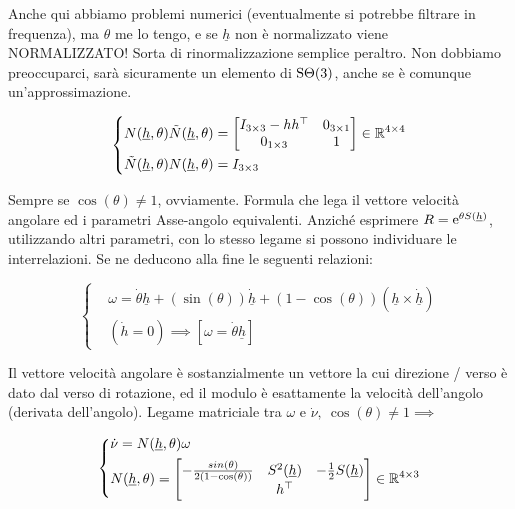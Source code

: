 Anche qui abbiamo problemi numerici (eventualmente si potrebbe filtrare in frequenza), ma $\theta$ me lo tengo, e se $\underline{h}$ non è normalizzato viene NORMALIZZATO! Sorta di rinormalizzazione semplice peraltro. Non dobbiamo preoccuparci, sarà sicuramente un elemento di $\operatorname{S\Theta}(3)$, anche se è comunque un'approssimazione.

\[
	\left\{
	\begin{aligned}
	&N(\underline{h},\theta)\tilde{N}(\underline{h},\theta) = \begin{bmatrix}I_{3\times 3}-hh^\top&0_{3\times 1}\\0_{1\times 3}&1\end{bmatrix}\in\mathbb{R}^{4\times 4}\\
	&\tilde{N}(\underline{h},\theta)N(\underline{h},\theta) = I_{3\times 3}
	\end{aligned}
	\right.
\]

Sempre se $\cos(\theta)\neq 1$, ovviamente. Formula che lega il vettore velocità angolare ed i parametri Asse-angolo equivalenti. Anziché esprimere $R=\mathop{}\!\mathrm{e}^{\theta S(\underline{h})}$, utilizzando altri parametri, con lo stesso legame si possono individuare le interrelazioni. Se ne deducono alla fine le seguenti relazioni:

\[
	\left\{
	\begin{aligned}
	&\omega = \dot{\theta}\underline{h} + (\sin(\theta))\underline{\dot{h}} + (1-\cos(\theta))(\underline{h}\times \underline{\dot{h}})\\
	&(\dot{h}=0)\implies [\omega=\dot{\theta}\underline{h}]
	\end{aligned}
	\right.
\]

Il vettore velocità angolare è sostanzialmente un vettore la cui direzione / verso è dato dal verso di rotazione, ed il modulo è esattamente la velocità dell'angolo (derivata dell'angolo). Legame matriciale tra $\omega$ e $\dot{\nu},\ \cos(\theta)\neq 1 \implies$

\[
	\left\{
	\begin{aligned}
	&\dot{\nu} = N(\underline{h},\theta)\omega\\
	&N(\underline{h},\theta)=\begin{bmatrix}-\frac{sin(\theta)}{2(1-\cos(\theta))}&S^2(\underline{h})&-\frac{1}{2}S(\underline{h})\\ & h^\top & \end{bmatrix}\in\mathbb{R}^{4\times 3}
	\end{aligned}
	\right.
\]

